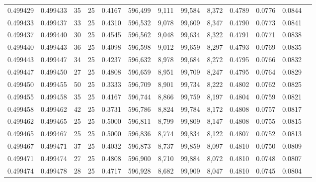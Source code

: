 \begin{tabular}{rrrrrrrrrrrrr}
0.499429 & 0.499433 &    35 &  25 &                                     0.4167 & 596,499 &   9,111 &  99,584 &   8,372 & 0.4789 & 0.0776 & 0.0844 \\
0.499433 & 0.499437 &    33 &  25 &                                     0.4310 & 596,532 &   9,078 &  99,609 &   8,347 & 0.4790 & 0.0773 & 0.0841 \\
0.499437 & 0.499440 &    30 &  25 &                                     0.4545 & 596,562 &   9,048 &  99,634 &   8,322 & 0.4791 & 0.0771 & 0.0838 \\
0.499440 & 0.499443 &    36 &  25 &                                     0.4098 & 596,598 &   9,012 &  99,659 &   8,297 & 0.4793 & 0.0769 & 0.0835 \\
0.499443 & 0.499447 &    34 &  25 &                                     0.4237 & 596,632 &   8,978 &  99,684 &   8,272 & 0.4795 & 0.0766 & 0.0832 \\
0.499447 & 0.499450 &    27 &  25 &                                     0.4808 & 596,659 &   8,951 &  99,709 &   8,247 & 0.4795 & 0.0764 & 0.0829 \\
0.499450 & 0.499455 &    50 &  25 &                                     0.3333 & 596,709 &   8,901 &  99,734 &   8,222 & 0.4802 & 0.0762 & 0.0825 \\
0.499455 & 0.499458 &    35 &  25 &                                     0.4167 & 596,744 &   8,866 &  99,759 &   8,197 & 0.4804 & 0.0759 & 0.0821 \\
0.499458 & 0.499462 &    42 &  25 &                                     0.3731 & 596,786 &   8,824 &  99,784 &   8,172 & 0.4808 & 0.0757 & 0.0817 \\
0.499462 & 0.499465 &    25 &  25 &                                     0.5000 & 596,811 &   8,799 &  99,809 &   8,147 & 0.4808 & 0.0755 & 0.0815 \\
0.499465 & 0.499467 &    25 &  25 &                                     0.5000 & 596,836 &   8,774 &  99,834 &   8,122 & 0.4807 & 0.0752 & 0.0813 \\
0.499467 & 0.499471 &    37 &  25 &                                     0.4032 & 596,873 &   8,737 &  99,859 &   8,097 & 0.4810 & 0.0750 & 0.0809 \\
0.499471 & 0.499474 &    27 &  25 &                                     0.4808 & 596,900 &   8,710 &  99,884 &   8,072 & 0.4810 & 0.0748 & 0.0807 \\
0.499474 & 0.499478 &    28 &  25 &                                     0.4717 & 596,928 &   8,682 &  99,909 &   8,047 & 0.4810 & 0.0745 & 0.0804 \\

\end{tabular}
